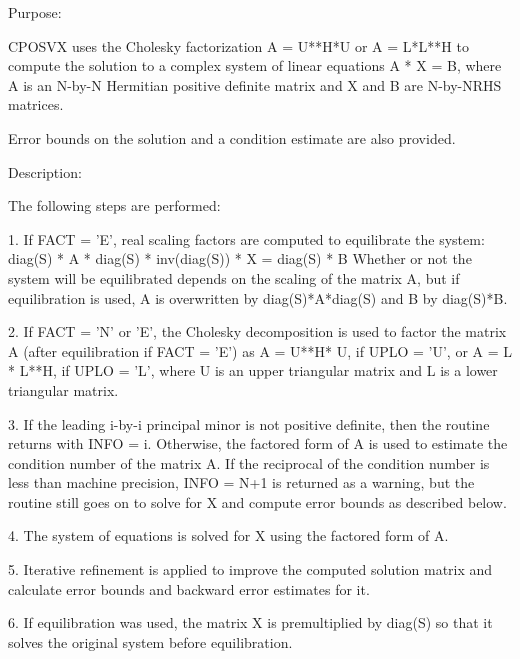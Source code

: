  \begin{DoxyParagraph}{Purpose\+: }
\begin{DoxyVerb} CPOSVX uses the Cholesky factorization A = U**H*U or A = L*L**H to
 compute the solution to a complex system of linear equations
    A * X = B,
 where A is an N-by-N Hermitian positive definite matrix and X and B
 are N-by-NRHS matrices.

 Error bounds on the solution and a condition estimate are also
 provided.\end{DoxyVerb}
 
\end{DoxyParagraph}
\begin{DoxyParagraph}{Description\+: }
\begin{DoxyVerb} The following steps are performed:

 1. If FACT = 'E', real scaling factors are computed to equilibrate
    the system:
       diag(S) * A * diag(S) * inv(diag(S)) * X = diag(S) * B
    Whether or not the system will be equilibrated depends on the
    scaling of the matrix A, but if equilibration is used, A is
    overwritten by diag(S)*A*diag(S) and B by diag(S)*B.

 2. If FACT = 'N' or 'E', the Cholesky decomposition is used to
    factor the matrix A (after equilibration if FACT = 'E') as
       A = U**H* U,  if UPLO = 'U', or
       A = L * L**H,  if UPLO = 'L',
    where U is an upper triangular matrix and L is a lower triangular
    matrix.

 3. If the leading i-by-i principal minor is not positive definite,
    then the routine returns with INFO = i. Otherwise, the factored
    form of A is used to estimate the condition number of the matrix
    A.  If the reciprocal of the condition number is less than machine
    precision, INFO = N+1 is returned as a warning, but the routine
    still goes on to solve for X and compute error bounds as
    described below.

 4. The system of equations is solved for X using the factored form
    of A.

 5. Iterative refinement is applied to improve the computed solution
    matrix and calculate error bounds and backward error estimates
    for it.

 6. If equilibration was used, the matrix X is premultiplied by
    diag(S) so that it solves the original system before
    equilibration.\end{DoxyVerb}
 
\end{DoxyParagraph}

